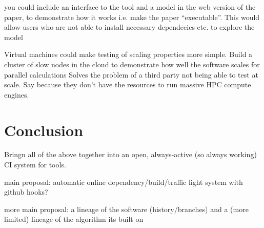 \documentclass[conference]{IEEEtran}
\begin{document}
you could include an interface to the tool and a model in the web
version of the paper, to demonstrate how it works i.e. make the paper
``executable''. This would allow users who are not able to install
necessary dependecies etc. to explore the model \cite{Hall2014}

Virtual machines could make testing of scaling properties more simple. 
Build a cluster of slow nodes in the cloud to demonstrate how well the
software scales for parallel calculations
%
Solves the problem of a third party not being able to test at
scale. Say because they don't have the resources to run massive HPC
compute engines.


\section{Conclusion}

Bringn all of the above together into an open, always-active (so always working) CI
system for tools. 

main proposal: automatic online dependency/build/traffic light system
with github hooks?

more main proposal: a lineage of the software (history/branches) and a
(more limited) lineage of the algorithm its built on





\end{document}
